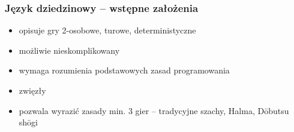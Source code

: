 \documentclass{beamer}
\begin{document}
\begin{frame}
	\frametitle{Język dziedzinowy -- wstępne założenia}
	\begin{itemize}
		\item opisuje gry 2-osobowe, turowe, deterministyczne
		\item możliwie nieskomplikowany
		\item wymaga rozumienia podstawowych zasad programowania
		\item zwięzły
		\item pozwala wyrazić zasady min. 3 gier -- tradycyjne szachy, Halma, Dōbutsu shōgi
	\end{itemize}
\end{frame}


\end{document}
